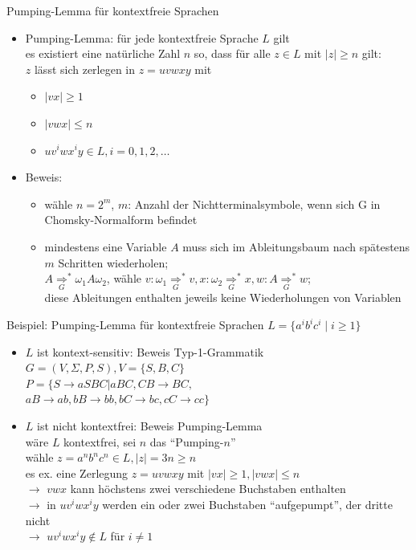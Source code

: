 \begin{frame}{Pumping-Lemma für kontextfreie Sprachen}
	\begin{itemize}
		\item Pumping-Lemma: für jede kontextfreie Sprache $L$ gilt\\
		es existiert eine natürliche Zahl $n$ so, dass für alle $z \in L$ mit $|z|\geq n$ gilt:\\
		$z$ lässt sich zerlegen in $z=uvwxy$ mit
		\begin{itemize}
			\item $|vx|\geq 1$
			\item $|vwx| \leq n$
			\item $uv^iwx^iy \in L, i=0, 1, 2, \ldots$
		\end{itemize}
		\item Beweis:
		\begin{itemize}
			\item wähle $n=2^m$, $m$: Anzahl der Nichtterminalsymbole, wenn sich G in Chomsky-Normalform befindet
			\item mindestens eine Variable $A$ muss sich im Ableitungsbaum nach spätestens $m$ Schritten wiederholen;\\
			$A\underset{G}{\Rightarrow}^*\omega_1 A \omega_2$, wähle $v: \omega_1 \underset{G}{\Rightarrow}^* v, x: \omega_2 \underset{G}{\Rightarrow}^* x, w: A \underset{G}{\Rightarrow}^* w$;\\
			diese Ableitungen enthalten jeweils keine Wiederholungen von Variablen
		\end{itemize}
	\end{itemize}
\end{frame}

\begin{frame}{Beispiel: Pumping-Lemma für kontextfreie Sprachen}
	$L=\{a^ib^ic^i \mid i\geq 1 \}$
	\begin{itemize}
		\item $L$ ist kontext-sensitiv: Beweis Typ-1-Grammatik\\
		$G=(V, \Sigma, P, S), V=\{S, B, C\}$\\
		$P=\{S\rightarrow aSBC | aBC, CB \rightarrow BC,$\\
		\qquad $aB \rightarrow ab, bB \rightarrow bb, bC \rightarrow bc, cC \rightarrow cc \}$
		\item $L$ ist nicht kontextfrei: Beweis Pumping-Lemma\\
		wäre $L$ kontextfrei, sei $n$ das "`Pumping-$n$"'\\
		wähle $z=a^nb^nc^n \in L, |z|=3n \geq n$\\
		es ex. eine Zerlegung $z=uvwxy$ mit $|vx|\geq 1, |vwx| \leq n$\\
		$\rightarrow$ $vwx$ kann höchstens zwei verschiedene Buchstaben enthalten\\
		$\rightarrow$ in $uv^iwx^iy$ werden ein oder zwei Buchstaben "`aufgepumpt"', der dritte nicht\\
		$\rightarrow$ $uv^iwx^iy \notin L$ für $i \neq 1$ \Lightning 
	\end{itemize}
\end{frame}

